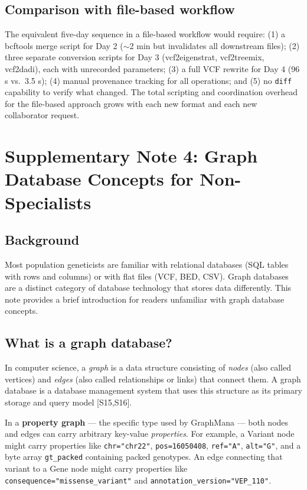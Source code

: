 \documentclass[11pt,a4paper]{article}
\begin{document}
\subsection*{Comparison with file-based workflow}

The equivalent five-day sequence in a file-based workflow would require: (1) a bcftools merge script for Day 2 ($\sim$2 min but invalidates all downstream files); (2) three separate conversion scripts for Day 3 (vcf2eigenstrat, vcf2treemix, vcf2dadi), each with unrecorded parameters; (3) a full VCF rewrite for Day 4 (96 s vs.\ 3.5 s); (4) manual provenance tracking for all operations; and (5) no \texttt{diff} capability to verify what changed. The total scripting and coordination overhead for the file-based approach grows with each new format and each new collaborator request.

\newpage

\section{Supplementary Note 4: Graph Database Concepts for Non-Specialists}

\subsection*{Background}

Most population geneticists are familiar with relational databases (SQL tables with rows and columns) or with flat files (VCF, BED, CSV). Graph databases are a distinct category of database technology that stores data differently. This note provides a brief introduction for readers unfamiliar with graph database concepts.

\subsection*{What is a graph database?}

In computer science, a \textit{graph} is a data structure consisting of \textit{nodes} (also called vertices) and \textit{edges} (also called relationships or links) that connect them. A graph database is a database management system that uses this structure as its primary storage and query model [S15,S16].

In a \textbf{property graph} --- the specific type used by GraphMana --- both nodes and edges can carry arbitrary key-value \textit{properties}. For example, a Variant node might carry properties like \texttt{chr="chr22"}, \texttt{pos=16050408}, \texttt{ref="A"}, \texttt{alt="G"}, and a byte array \texttt{gt\_packed} containing packed genotypes. An edge connecting that variant to a Gene node might carry properties like \texttt{consequence="missense\_variant"} and \texttt{annotation\_version="VEP\_110"}.
\end{document}
